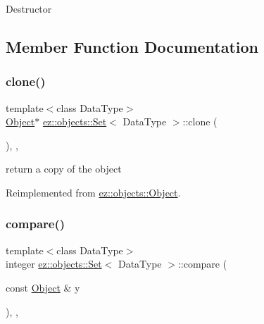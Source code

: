 Destructor 

\subsection{Member Function Documentation}
\mbox{\label{classez_1_1objects_1_1Set_a1faa8b09dc50d82e203d3e31f3b9f33e}} 
\subsubsection{\texorpdfstring{clone()}{clone()}}
{\footnotesize\ttfamily template$<$class Data\+Type$>$ \\
\hyperlink{classez_1_1objects_1_1Object}{Object}$\ast$ \hyperlink{classez_1_1objects_1_1Set}{ez\+::objects\+::\+Set}$<$ Data\+Type $>$\+::clone (\begin{DoxyParamCaption}{ }\end{DoxyParamCaption})\hspace{0.3cm}{\ttfamily [inline]}, {\ttfamily [override]}, {\ttfamily [virtual]}}

return a copy of the object 

Reimplemented from \hyperlink{classez_1_1objects_1_1Object_acf444b2581d898eb4b8c92c2d5865c9e}{ez\+::objects\+::\+Object}.

\mbox{\label{classez_1_1objects_1_1Set_aeaab2cadd3a001a94acb40d7cf2b2b00}} 
\subsubsection{\texorpdfstring{compare()}{compare()}}
{\footnotesize\ttfamily template$<$class Data\+Type$>$ \\
integer \hyperlink{classez_1_1objects_1_1Set}{ez\+::objects\+::\+Set}$<$ Data\+Type $>$\+::compare (\begin{DoxyParamCaption}\item[{const \hyperlink{classez_1_1objects_1_1Object}{Object} \&}]{y }\end{DoxyParamCaption})\hspace{0.3cm}{\ttfamily [inline]}, {\ttfamily [override]}, {\ttfamily [virtual]}}

